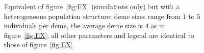 \documentclass[11pt, letterpaper]{article}
\begin{document}
\begin{figure}
\caption{Equivalent of figure~\ref{fig:EX} (simulations only) but with a heterogeneous population structure: deme sizes range from $1$ to $5$ individuals per deme, the average deme size is $4$ as in figure~\ref{fig:EX};  all other parameters and legend are identical to those of figure~\ref{fig:EX}. }
\label{fig:EXhtg}
\end{figure}


 
\end{document}
